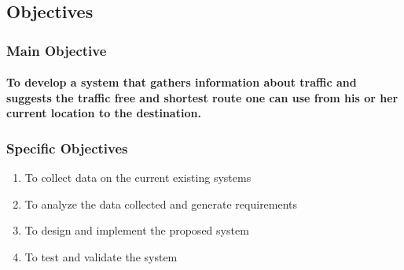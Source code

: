 \documentclass[11pt]{article}
\begin{document}
	 \subsection{\textbf{Objectives}}
	 \subsubsection{\textbf{Main Objective}}
	  
	  \paragraph{\textmd{To develop a system that gathers information about traffic and suggests the traffic free and shortest route one can use from his or her current location to the destination.}}
	  	
	   \subsubsection{\textbf{Specific Objectives}}
	   
	   \begin{enumerate}
	   
	   \item To collect data on the current existing systems
	   \item To analyze the data collected and generate requirements
	   \item To design and implement the proposed system 
	   \item To test and validate the system
	           
	   \end{enumerate} 	  
 
    	
    	 
       
\end{document}
